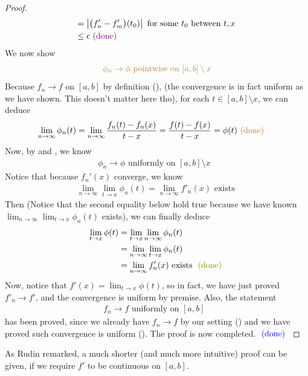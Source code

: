 \documentclass{report}
\begin{document}
\begin{proof}
\begin{align*}
 &=\left|\big(f'_n-f'_m\big)(t_0)\right|\text{ for some $t_0$ between $t,x$  }\\
&\leq \epsilon \textcolor{violet}{\text{ (done) }}
\end{align*}
We now show 
\begin{align}
\label{UCACP}
\textcolor{brown}{\phi_n \to \phi\text{ pointwise on $[a,b]\setminus x$}}
\end{align}
Because $f_n \to f$ on $[a,b]$ by definition (), (the convergence is in fact uniform as we have shown. This doesn't matter here tho), for each $t \in [a,b]\setminus x$, we can deduce
\begin{align*}
\lim_{n\to \infty} \phi_n(t)&=\lim_{n\to \infty}\frac{f_n(t)-f_n(x)}{t-x}=\frac{f(t)-f(x)}{t-x}=\phi (t)\textcolor{brown}{\text{ (done) }}
\end{align*}
Now, by  and , we know 
\begin{align*}
\phi_n \to \phi \text{ uniformly on $[a,b]\setminus x$ }
\end{align*}
Notice that because $f_n'(x)$ converge, we know
\begin{align*}
\lim_{n\to \infty}\lim_{t\to x}\phi_n(t)=\lim_{n\to \infty}f'_n(x)\text{ exists }
\end{align*}
Then (Notice that the second equality below hold true because we have known $\lim_{n\to \infty}\lim_{t\to x}\phi_n(t)$ exists), we can finally deduce 
\begin{align*}
\lim_{t\to x}\phi (t)&=\lim_{t\to x}\lim_{n\to \infty}\phi_n(t)\\
&=\lim_{n\to \infty}\lim_{t\to x}\phi_n(t)\\
&=\lim_{n\to \infty}f'_n(x)\text{ exists }\odone
\end{align*}
Now, notice that $f'(x)=\lim_{t\to x}\phi (t)$, so in fact, we have just proved $f'_n \to f'$, and the convergence is uniform by premise. Also, the statement 
\begin{align*}
f_n\to f\text{ uniformly on $[a,b]$ }
\end{align*}
has been proved, since we already have $f_n \to f$ by our setting () and we have proved such convergence is uniform (). The proof is now completed. $\textcolor{blue}{\text{ (done) }}$
\end{proof}
\begin{mdframed}
As Rudin remarked, a much shorter (and much more intuitive) proof can be given, if we require $f'$ to be continuous on  $[a,b]$. 
\end{mdframed}
\end{document}

